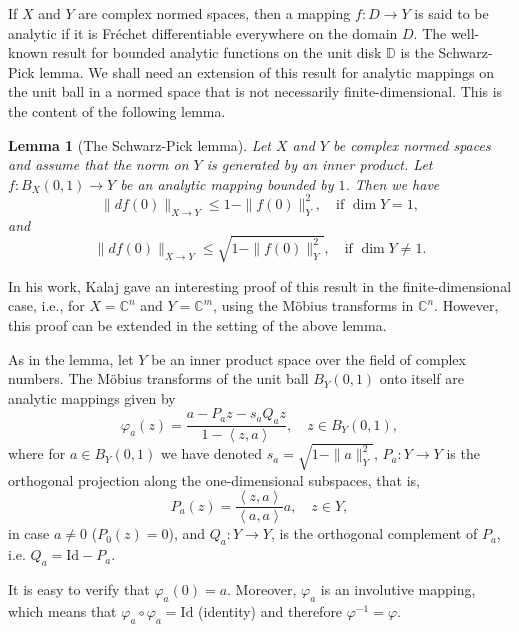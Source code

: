 \documentclass{amsart}
\newtheorem{lemma}[theorem]{Lemma}
\theoremstyle{definition}
\numberwithin{equation}{section}
\begin{document}
If $X$ and $Y$ are complex normed spaces, then a mapping $f:D\to Y$ is said to be analytic if it is Fr\'{e}chet
differentiable everywhere on the domain $D$. The well-known result for bounded analytic functions on the unit disk
$\mathbb{D}$ is the Schwarz-Pick lemma. We shall need an extension of this result for analytic mappings on the unit ball
in a normed space that is not necessarily finite-dimensional. This is the content of the following lemma.

\begin{lemma}[The Schwarz-Pick lemma]\label{LE.SCHWARZ-PICK}
Let $X$ and $Y$ be complex normed spaces and assume that the norm on $Y$ is generated by an inner product. Let
$f:B_X(0,1)\to Y$ be an analytic mapping bounded by $1$. Then we have
\begin{equation*}
\|d f(0)\|_{X\to Y}\le {1-\|f(0)\|_Y^2},\quad  \text{if }\dim Y =1,
\end{equation*}
and
\begin{equation*}
\|d f(0)\|_{X\to Y}\le \sqrt{1-\|f(0)\|_Y^2},\quad \text{if }\dim Y\not = 1.
\end{equation*}
\end{lemma}

In his work, Kalaj \cite{KALAJ.GJM} gave an interesting proof of this result in the finite-dimensional case, i.e., for
$X = \mathbb{C}^n$ and $Y = \mathbb{C}^m$, using the M\"{o}bius transforms in $\mathbb{C}^n$. However, this proof can
be extended in the setting of the above lemma.

As in the lemma, let $Y$ be an inner product space over the field of complex numbers. The  M\"{o}bius transforms of the
unit ball $B_Y(0,1)$ onto itself are analytic mappings given by
\begin{equation*}
\varphi_a  (z) = \frac{a - P_a z - s_a Q_a z}{1- \left<z,a\right>},\quad z\in B_Y(0,1),
\end{equation*}
where for $a\in B_Y(0,1)$ we have denoted $s_a = \sqrt{1-\|a\|_Y^2}$, $P_a:Y\to Y$ is the orthogonal projection along
the one-dimensional subspaces, that is,
\begin{equation*}
P_a(z) = \frac{\left<z,a\right>}{\left<a,a\right>}a, \quad z\in Y,
\end{equation*}
in case $a\ne  0$ ($P_ 0 (z) = 0$), and $Q_a:Y\to Y$, is the orthogonal complement of $P_a$, i.e. $Q_a = \mathrm {Id} - P_a$.

It is easy to verify that $\varphi_a (0) = a$. Moreover, $\varphi_a$ is an involutive mapping, which means that
$\varphi_a \circ\varphi_a = \mathrm{Id}$ (identity) and therefore $\varphi^{-1} = \varphi$.
\end{document}
